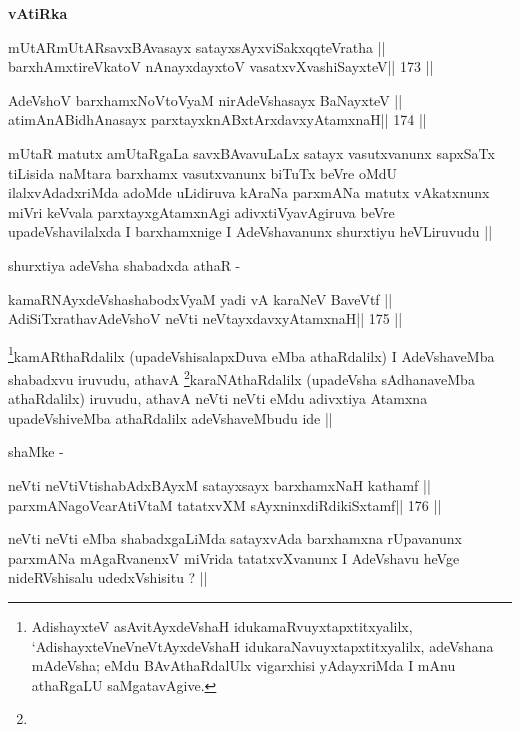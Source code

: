\begin{center}
\textbf{vAtiRka}
\end{center}

\begin{shl}
mUtARmUtARsavxBAvasayx satayxsAyx\s\s viSakxqqteVratha ||
barxhAmxtireVkatoV nAnayxdayxtoV vasatxvXvashiSayxteV\hfill || 173 ||
\end{shl}

\begin{shl}
AdeVshoV barxhamxNoV\s toV\s yaM nirAdeVshasayx BaNayxteV ||
atimAnABidhAnasayx parxtayxknABxtArxdavxyAtamxnaH\hfill || 174 ||
\end{shl}

\begin{artha}
mUtaR matutx amUtaRgaLa savxBAvavuLaLx satayx vasutxvanunx sapxSaTx
tiLisida naMtara barxhamx vasutxvanunx biTuTx beVre oMdU
ilalxvAdadxriMda adoMde uLidiruva kAraNa parxmANa matutx vAkatxnunx
miVri keVvala parxtayxgAtamxnAgi adivxtiVyavAgiruva beVre
upadeVshavilalxda I barxhamxnige I AdeVshavanunx shurxtiyu heVLiruvudu
||

shurxtiya adeVsha shabadxda athaR -
\end{artha}

\begin{shl}
kamaRNAyxdeVshashabodxV\s yaM yadi vA karaNeV BaveVtf ||
AdiSiTxrathavA\s\s deVshoV neVti neVtayxdavxyAtamxnaH\hfill || 175 ||
\end{shl}

\begin{artha}
\footnote[1]{AdishayxteV asAvitAyxdeVshaH idukamaRvuyxtapxtitxyalilx,
  `AdishayxteV\s neVneVtAyxdeVshaH idukaraNavuyxtapxtitxyalilx,
  adeVshana mAdeVsha; eMdu BAvAthaRdalUlx vigarxhisi yAdayxriMda I
  mAnu athaRgaLU saMgatavAgive.}kamARthaRdalilx (upadeVshisalapxDuva eMba athaRdalilx) I
AdeVshaveMba shabadxvu iruvudu, athavA \footnote[2]{}karaNAthaRdalilx
(upadeVsha sAdhanaveMba athaRdalilx) iruvudu, athavA neVti neVti eMdu
adivxtiya Atamxna upadeVshiveMba athaRdalilx adeVshaveMbudu ide ||

shaMke -
\end{artha}

\begin{shl}
neVti neVtiVtishabAdxBAyxM satayxsayx barxhamxNaH kathamf ||
parxmANagoVcarAtiVtaM tatatxvXM sAyxninxdiRdikiSxtamf\hfill || 176 ||
\end{shl}

\begin{artha}
neVti neVti eMba shabadxgaLiMda satayxvAda barxhamxna rUpavanunx
parxmANa mAgaRvanenxV miVrida tatatxvXvanunx I AdeVshavu heVge
nideRVshisalu udedxVshisitu ? ||
\end{artha}


